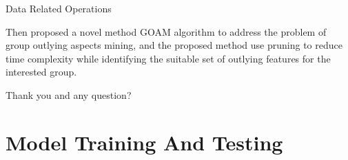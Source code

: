 \documentclass[
 size=14pt,
 paper=smartboard,  %
 mode=present, 		%
 display=slides, 	%
 style=tuliplab,  	%
 pauseslide,
 fleqn,leqno]{powerdot}
\begin{document}
\begin{slide}[toc=,bm=]{ Data Related Operations}
\begin{note}
  Then proposed a novel method GOAM algorithm to address the problem of
  group outlying aspects mining,
  and the proposed method use pruning to reduce time complexity
  while identifying the suitable set of outlying features for the interested group.
  
  Thank you and any question?
  \end{note}
  
  \end{slide}
  


\section{Model Training And Testing} 

\end{document}
